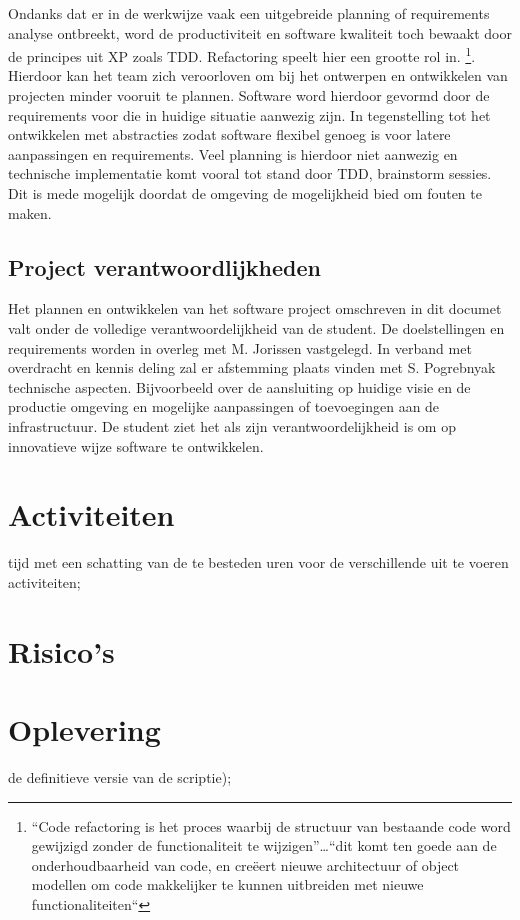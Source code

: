     Ondanks dat er in de werkwijze vaak een uitgebreide planning of requirements analyse ontbreekt, word de productiviteit en software kwaliteit toch bewaakt door de principes uit XP zoals TDD. Refactoring speelt hier een grootte rol in.\parencite{refactoring-ruby}
    \footnote{“Code refactoring is het proces waarbij de structuur van bestaande code word gewijzigd zonder de functionaliteit te wijzigen”…“dit komt ten goede aan de onderhoudbaarheid van code, en creëert nieuwe architectuur of object modellen om code makkelijker te kunnen uitbreiden met nieuwe functionaliteiten“}.
    Hierdoor kan het team zich veroorloven om bij het ontwerpen en ontwikkelen van projecten minder vooruit te plannen. Software word hierdoor gevormd door de requirements voor die in huidige situatie aanwezig zijn. In tegenstelling tot het ontwikkelen met abstracties zodat software flexibel genoeg is voor latere aanpassingen en requirements. Veel planning is hierdoor niet aanwezig en technische implementatie komt vooral tot stand door TDD, brainstorm sessies. Dit is mede mogelijk doordat de omgeving de mogelijkheid bied om fouten te maken.

    \subsection{Project verantwoordlijkheden}

    Het plannen en ontwikkelen van het software project omschreven in dit documet valt onder de volledige verantwoordelijkheid van de student. De doelstellingen en requirements worden in overleg met M. Jorissen vastgelegd. In verband met overdracht en kennis deling zal er afstemming plaats vinden met S. Pogrebnyak technische aspecten. Bijvoorbeeld over de aansluiting op huidige visie en de productie omgeving en mogelijke aanpassingen of toevoegingen aan de infrastructuur.
    De student ziet het als zijn verantwoordelijkheid is om op innovatieve wijze software te ontwikkelen.


\section{Activiteiten} %
tijd met een schatting van de te besteden uren voor de verschillende uit te voeren activiteiten;

\section{Risico's} %

\section{Oplevering}

de definitieve versie van de scriptie);
